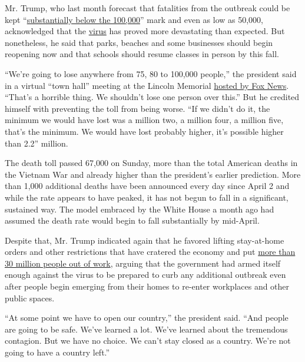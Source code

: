 Mr. Trump, who last month forecast that fatalities from the outbreak
could be kept
``\href{https://www.whitehouse.gov/briefings-statements/remarks-president-trump-vice-president-pence-members-coronavirus-task-force-press-briefing-24/}{substantially
below the 100,000}'' mark and even as low as 50,000, acknowledged that
the
\href{https://www.nytimes.com/2020/05/04/us/politics/trump-coronavirus-death-toll.html}{virus}
has proved more devastating than expected. But nonetheless, he said that
parks, beaches and some businesses should begin reopening now and that
schools should resume classes in person by this fall.

``We're going to lose anywhere from 75, 80 to 100,000 people,'' the
president said in a virtual ``town hall'' meeting at the Lincoln
Memorial
\href{https://www.foxnews.com/politics/trump-virtual-town-hall-america-together-returning-to-work-coronavirus-lincoln-memorial}{hosted
by Fox News}. ``That's a horrible thing. We shouldn't lose one person
over this.'' But he credited himself with preventing the toll from being
worse. ``If we didn't do it, the minimum we would have lost was a
million two, a million four, a million five, that's the minimum. We
would have lost probably higher, it's possible higher than 2.2''
million.

The death toll passed 67,000 on Sunday, more than the total American
deaths in the Vietnam War and already higher than the president's
earlier prediction. More than 1,000 additional deaths have been
announced every day since April 2 and while the rate appears to have
peaked, it has not begun to fall in a significant, sustained way. The
model embraced by the White House a month ago had assumed the death rate
would begin to fall substantially by mid-April.

Despite that, Mr. Trump indicated again that he favored lifting
stay-at-home orders and other restrictions that have cratered the
economy and put
\href{https://www.nytimes.com/2020/04/30/business/economy/coronavirus-unemployment-claims.html}{more
than 30 million people out of work}, arguing that the government had
armed itself enough against the virus to be prepared to curb any
additional outbreak even after people begin emerging from their homes to
re-enter workplaces and other public spaces.

``At some point we have to open our country,'' the president said. ``And
people are going to be safe. We've learned a lot. We've learned about
the tremendous contagion. But we have no choice. We can't stay closed as
a country. We're not going to have a country left.''

